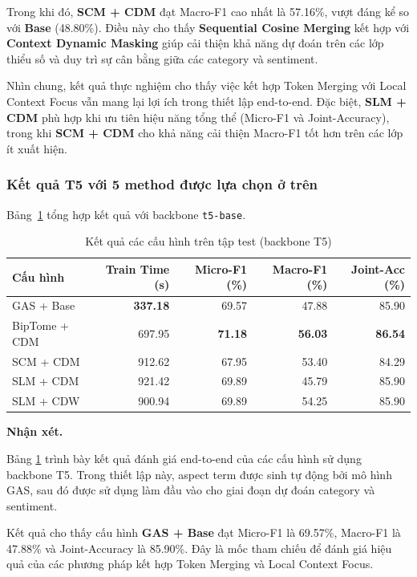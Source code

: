 Trong khi đó, \textbf{SCM + CDM} đạt Macro-F1 cao nhất là 57.16\%, vượt đáng kể so với \textbf{Base} (48.80\%). Điều này cho thấy \textbf{Sequential Cosine Merging} kết hợp với \textbf{Context Dynamic Masking} giúp cải thiện khả năng dự đoán trên các lớp thiểu số và duy trì sự cân bằng giữa các category và sentiment.

Nhìn chung, kết quả thực nghiệm cho thấy việc kết hợp Token Merging với Local Context Focus vẫn mang lại lợi ích trong thiết lập end-to-end. Đặc biệt, \textbf{SLM + CDM} phù hợp khi ưu tiên hiệu năng tổng thể (Micro-F1 và Joint-Accuracy), trong khi \textbf{SCM + CDM} cho khả năng cải thiện Macro-F1 tốt hơn trên các lớp ít xuất hiện.

\subsubsection*{Kết quả T5 với 5 method được lựa chọn ở trên}
Bảng~\ref{tab:t5_results} tổng hợp kết quả với backbone \texttt{t5-base}.

\begin{table}[H]
\centering
\small
\caption{Kết quả các cấu hình trên tập test (backbone T5)}
\label{tab:t5_results}
\begin{tabular}{@{}lrrrr@{}}
\toprule
\textbf{Cấu hình} & \textbf{Train Time (s)} & \textbf{Micro-F1 (\%)} & \textbf{Macro-F1 (\%)} & \textbf{Joint-Acc (\%)} \\
\midrule
GAS + Base           & \textbf{337.18} & 69.57 & 47.88 & 85.90 \\
BipTome + CDM       & 697.95 & \textbf{71.18} & \textbf{56.03} & \textbf{86.54} \\
SCM + CDM     & 912.62 & 67.95 & 53.40 & 84.29 \\
SLM + CDM       & 921.42 & 69.89 & 45.79 & 85.90 \\
SLM + CDW       & 900.94 & 69.89 & 54.25 & 85.90 \\
\bottomrule
\end{tabular}
\end{table}

\textbf{Nhận xét.}

Bảng \ref{tab:t5_results} trình bày kết quả đánh giá end-to-end của các cấu hình sử dụng backbone T5. Trong thiết lập này, aspect term được sinh tự động bởi mô hình GAS, sau đó được sử dụng làm đầu vào cho giai đoạn dự đoán category và sentiment.

Kết quả cho thấy cấu hình \textbf{GAS + Base} đạt Micro-F1 là 69.57\%, Macro-F1 là 47.88\% và Joint-Accuracy là 85.90\%. Đây là mốc tham chiếu để đánh giá hiệu quả của các phương pháp kết hợp Token Merging và Local Context Focus.

